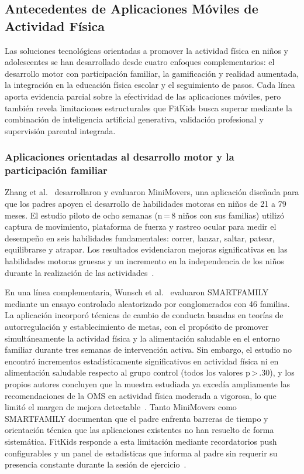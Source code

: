 			\subsection{Antecedentes de Aplicaciones Móviles de Actividad Física}
				Las soluciones tecnológicas orientadas a promover la actividad física en niños y adolescentes se han desarrollado desde cuatro enfoques complementarios: el desarrollo motor con participación familiar, la gamificación y realidad aumentada, la integración en la educación física escolar y el seguimiento de pasos. Cada línea aporta evidencia parcial sobre la efectividad de las aplicaciones móviles, pero también revela limitaciones estructurales que FitKids busca superar mediante la combinación de inteligencia artificial generativa, validación profesional y supervisión parental integrada.
			
			\subsubsection{Aplicaciones orientadas al desarrollo motor y la participación familiar}
				Zhang et al.~\cite{Zhang2024} desarrollaron y evaluaron MiniMovers, una aplicación diseñada para que los padres apoyen el desarrollo de habilidades motoras en niños de 21 a 79 meses. El estudio piloto de ocho semanas (n\,=\,8 niños con sus familias) utilizó captura de movimiento, plataforma de fuerza y rastreo ocular para medir el desempeño en seis habilidades fundamentales: correr, lanzar, saltar, patear, equilibrarse y atrapar. Los resultados evidenciaron mejoras significativas en las habilidades motoras gruesas y un incremento en la independencia de los niños durante la realización de las actividades~\cite{Zhang2024}.
				
				En una línea complementaria, Wunsch et al.~\cite{Wunsch2024} evaluaron SMARTFAMILY mediante un ensayo controlado aleatorizado por conglomerados con 46 familias. La aplicación incorporó técnicas de cambio de conducta basadas en teorías de autorregulación y establecimiento de metas, con el propósito de promover simultáneamente la actividad física y la alimentación saludable en el entorno familiar durante tres semanas de intervención activa. Sin embargo, el estudio no encontró incrementos estadísticamente significativos en actividad física ni en alimentación saludable respecto al grupo control (todos los valores p\,>\,.30), y los propios autores concluyen que la muestra estudiada ya excedía ampliamente las recomendaciones de la OMS en actividad física moderada a vigorosa, lo que limitó el margen de mejora detectable~\cite{Wunsch2024}. Tanto MiniMovers como SMARTFAMILY documentan que el padre enfrenta barreras de tiempo y orientación técnica que las aplicaciones existentes no han resuelto de forma sistemática. FitKids responde a esta limitación mediante recordatorios push configurables y un panel de estadísticas que informa al padre sin requerir su presencia constante durante la sesión de ejercicio~\cite{Zhang2024,Wunsch2024}.
			
